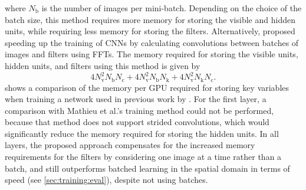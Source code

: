 where $N_\text{b}$ is the number of images per mini-batch. Depending on the
choice of the batch size, this method requires more memory for storing the
visible and hidden units, while requiring less memory for storing the filters.
Alternatively, \citet{mathieu2013} proposed speeding up the training of CNNs by
calculating convolutions between batches of images and filters using FFTs. The
memory required for storing the visible units, hidden units, and filters using
this method is given by
\begin{equation}
4 N_\text{v}^2 N_\text{b}N_\text{c} + 4
N_\text{v}^2 N_\text{b}N_\text{k} + 4 N_\text{v}^2 N_\text{k}N_\text{c}.
\end{equation}
 shows a comparison of the memory per GPU required for
storing key variables when training a network used in previous work by
\citet{krizhevsky2012}. For the first layer, a comparison with Mathieu et al.'s
training method could not be performed, because that method does not support
strided convolutions, which would significantly reduce the memory required for
storing the hidden units. In all layers, the proposed approach compensates for
the increased memory requirements for the filters by considering one image at a
time rather than a batch, and still outperforms batched learning in the spatial
domain in terms of speed (see \ref{sec:training:eval}), despite not using
batches.


